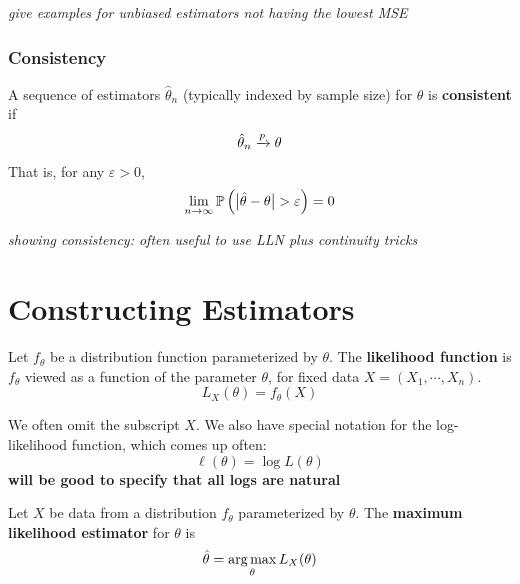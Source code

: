 \documentclass[../../../main.tex]{subfiles}
\begin{document}
\textit{give examples for unbiased estimators not having the lowest MSE}

\subsubsection{Consistency}

\begin{definition}
    A sequence of estimators $\hat \theta_n$ (typically indexed by sample size) for $\theta$ is \textbf{consistent} if
    \begin{equation*}
        \hat \theta_n \xrightarrow{p} \theta
    \end{equation*}
    That is, for any $\varepsilon>0$,
    \begin{equation*}
        \lim_{n\rightarrow\infty}\Prob\left(\bigl|\hat \theta -\theta\bigr|>\varepsilon\right)=0
    \end{equation*}
\end{definition}

\textit{showing consistency: often useful to use LLN plus continuity tricks}

\section{Constructing Estimators}

\begin{definition}
    Let $f_\theta$ be a distribution function parameterized by $\theta$. 
    The \textbf{likelihood function} is $f_\theta$ viewed as a function of the parameter $\theta$, for fixed data $X=(X_1,\cdots,X_n)$.
    \begin{equation*}
        L_X(\theta)=f_\theta(X)
    \end{equation*}
    
    We often omit the subscript $X$.
    We also have special notation for the log-likelihood function, which comes up often:
    \begin{equation*}
        \ell(\theta)=\log L(\theta)
    \end{equation*}
    \textbf{will be good to specify that all logs are natural}
\end{definition}

\begin{definition}
    Let $X$ be data from a distribution $f_\theta$ parameterized by $\theta$.
    The \textbf{maximum likelihood estimator} for $\theta$ is
    \begin{equation*}
        \hat \theta=\operatorname*{arg\,max}_\theta L_X(\theta)
    \end{equation*}
\end{definition}
\end{document}
